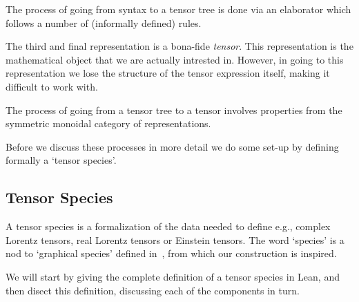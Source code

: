 \documentclass[a4paper, 11pt]{article}
\begin{document}
The process of going from syntax to a tensor tree is done via an elaborator 
which follows a number of (informally defined) rules.

The third and final representation is a bona-fide \emph{tensor}. This representation 
is the mathematical object that we are actually intrested in. However, in going to this representation
we lose the structure of the tensor expression itself, making it difficult to work with. 

The process of going from a tensor tree to a tensor involves properties from the symmetric monoidal 
category of representations. 

Before we discuss these processes in more detail we do some set-up by defining formally a 
`tensor species'. 

\subsection{Tensor Species}

A tensor species is a formalization of the data needed to define e.g., complex Lorentz tensors, 
real Lorentz tensors or Einstein tensors. The word `species' is a nod to `graphical species'
defined in~\cite{JOYAL2011105,raynor2021graphical}, from which our construction is inspired.

We will start by giving the complete definition of a tensor species in Lean, and then 
disect this definition, discussing each of the components in turn. 
\end{document}
